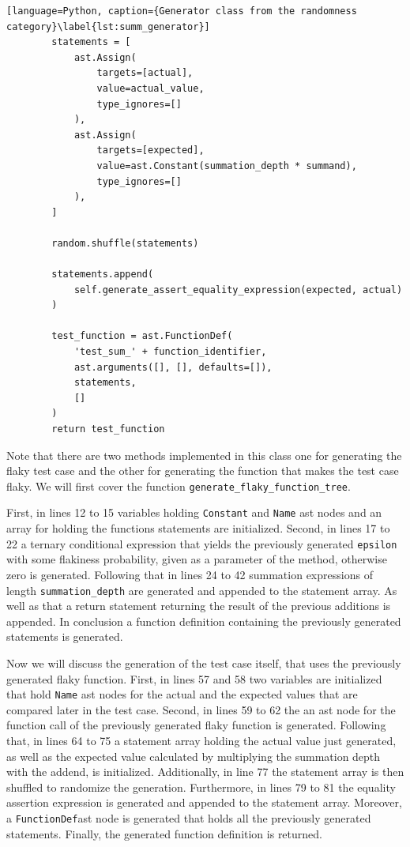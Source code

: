 \documentclass[
fancyheadings, %
%
%
]{stsreprt}
\begin{document}
\begin{lstlisting}[language=Python, caption={Generator class from the randomness category}\label{lst:summ_generator}]
        statements = [
            ast.Assign(
                targets=[actual], 
                value=actual_value,
                type_ignores=[]
            ),
            ast.Assign(
                targets=[expected], 
                value=ast.Constant(summation_depth * summand),
                type_ignores=[]
            ),
        ]

        random.shuffle(statements)

        statements.append(
            self.generate_assert_equality_expression(expected, actual)
        )

        test_function = ast.FunctionDef(
            'test_sum_' + function_identifier,
            ast.arguments([], [], defaults=[]),
            statements,
            []
        )
        return test_function

\end{lstlisting}
Note that there are two methods implemented in this class one for generating the flaky test case and the other for generating the function that makes the test case flaky. 
We will first cover the function \lstinline{generate_flaky_function_tree}. \par
First, in lines 12 to 15 variables holding \texttt{Constant} and \texttt{Name} \acrshort{ast} nodes and an array for holding the functions statements are initialized. 
Second, in lines 17 to 22 a ternary conditional expression that yields the previously generated \texttt{epsilon} with some flakiness probability, given as a parameter of the method, otherwise zero is generated. 
Following that in lines 24 to 42  summation expressions of length \lstinline{summation_depth} are generated and appended to the statement array. 
As well as that a return statement returning the result of the previous additions is appended. 
In conclusion a function definition containing the previously generated statements is generated. \par
Now we will discuss the generation of the test case itself, that uses the previously generated flaky function.
First, in lines 57 and 58 two variables are initialized that hold \texttt{Name} \acrshort{ast} nodes for the actual and the expected values that are compared later in the test case. 
Second, in lines 59 to 62 the an \acrshort{ast} node for the function call of the previously generated flaky function is generated. 
Following that, in lines 64 to 75 a statement array holding the actual value just generated, as well as the expected value calculated by multiplying the summation depth with the addend, is initialized. 
Additionally, in line 77 the statement array is then shuffled to randomize the generation. 
Furthermore, in lines 79 to 81 the equality assertion expression is generated and appended to the statement array. 
Moreover, a \texttt{FunctionDef}\acrshort{ast} node is generated that holds all the previously generated statements.
Finally, the generated function definition is returned. 
\end{document}
